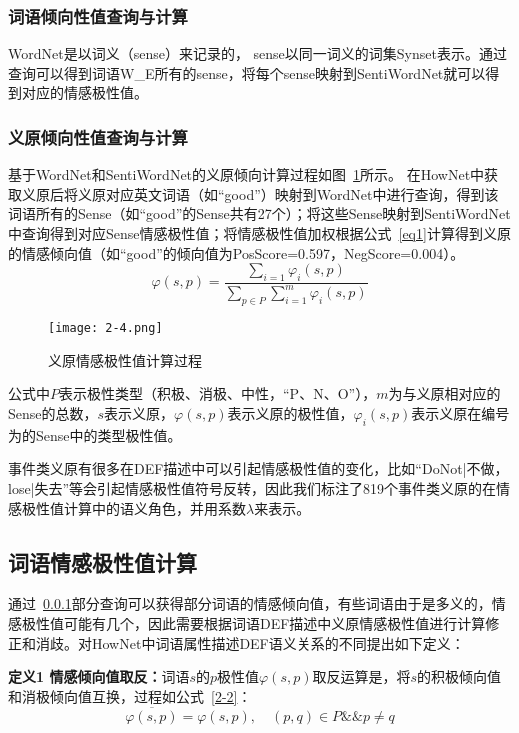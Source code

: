 \subsubsection{词语倾向性值查询与计算}
\label{sense}
WordNet是以词义（sense）来记录的， sense以同一词义的词集Synset表示。通过查询可以得到词语W\_E所有的sense，将每个sense映射到SentiWordNet就可以得到对应的情感极性值。

\subsubsection{义原倾向性值查询与计算}
基于WordNet和SentiWordNet的义原倾向计算过程如图~\ref{atomsen}所示。
在HowNet中获取义原后将义原对应英文词语（如“good”）映射到WordNet中进行查询，得到该词语所有的Sense（如“good”的Sense共有27个）；将这些Sense映射到SentiWordNet中查询得到对应Sense情感极性值；将情感极性值加权根据公式~\ref{eq1}计算得到义原的情感倾向值（如“good”的倾向值为PosScore=0.597，NegScore=0.004）。
\begin{equation}
\label{eq1}
\varphi(s,p)=\dfrac{\sum_{i=1} \varphi_i (s,p)}{\sum_{p\in P}\sum_{i=1}^m \varphi_i(s,p)}
\end{equation}

\begin{figure}[htp]
\centering
\texttt{[image: 2-4.png]}
\caption{义原情感极性值计算过程}
\label{atomsen}
\end{figure}

公式中$ P$表示极性类型（积极、消极、中性，“P、N、O”），$m$为与义原相对应的Sense的总数，$s$表示义原，$\varphi(s,p)$表示义原的极性值，$\varphi_i (s,p)$表示义原在编号为的Sense中的类型极性值。

事件类义原有很多在DEF描述中可以引起情感极性值的变化，比如“DoNot|不做，lose|失去”等会引起情感极性值符号反转，因此我们标注了819个事件类义原的在情感极性值计算中的语义角色，并用系数$\lambda$来表示。

\subsection{词语情感极性值计算}
通过~\ref{sense}部分查询可以获得部分词语的情感倾向值，有些词语由于是多义的，情感极性值可能有几个，因此需要根据词语DEF描述中义原情感极性值进行计算修正和消歧。对HowNet中词语属性描述DEF语义关系的不同提出如下定义：

\textbf{定义1 情感倾向值取反：}词语$s$的$p$极性值$\varphi(s,p)$取反运算是，将$s$的积极倾向值和消极倾向值互换，过程如公式~\ref{2-2}：
\begin{equation}
\label{2-2}
\overline{\varphi(s,p)}=\varphi(s,p),\quad (p,q) \in P\&\& p \neq q
\end{equation}

